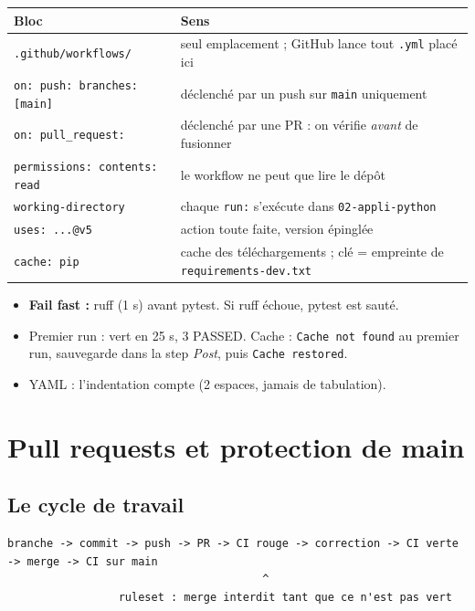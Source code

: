 \documentclass[11pt,a4paper]{article}
\newcommand{\cmd}[1]{\texttt{#1}}
\begin{document}
\begin{center}
\begin{tabularx}{\linewidth}{@{}l X@{}}
\toprule
\textbf{Bloc} & \textbf{Sens} \\
\midrule
\cmd{.github/workflows/} & seul emplacement ; GitHub lance tout \cmd{.yml} placé ici \\
\cmd{on: push: branches: [main]} & déclenché par un push sur \cmd{main} uniquement \\
\cmd{on: pull\_request:} & déclenché par une PR : on vérifie \emph{avant} de fusionner \\
\cmd{permissions: contents: read} & le workflow ne peut que lire le dépôt \\
\cmd{working-directory} & chaque \cmd{run:} s'exécute dans \cmd{02-appli-python} \\
\cmd{uses: ...@v5} & action toute faite, version épinglée \\
\cmd{cache: pip} & cache des téléchargements ; clé = empreinte de \cmd{requirements-dev.txt} \\
\bottomrule
\end{tabularx}
\end{center}

\begin{itemize}
  \item \textbf{Fail fast :} ruff (1 s) avant pytest. Si ruff échoue, pytest est sauté.
  \item Premier run : vert en 25 s, 3 PASSED. Cache : \cmd{Cache not found} au premier run, sauvegarde dans la step \emph{Post}, puis \cmd{Cache restored}.
  \item YAML : l'indentation compte (2 espaces, jamais de tabulation).
\end{itemize}

\section{Pull requests et protection de main}

\subsection{Le cycle de travail}
\begin{lstlisting}
branche -> commit -> push -> PR -> CI rouge -> correction -> CI verte -> merge -> CI sur main
                                       ^
                 ruleset : merge interdit tant que ce n'est pas vert
\end{lstlisting}
\end{document}
